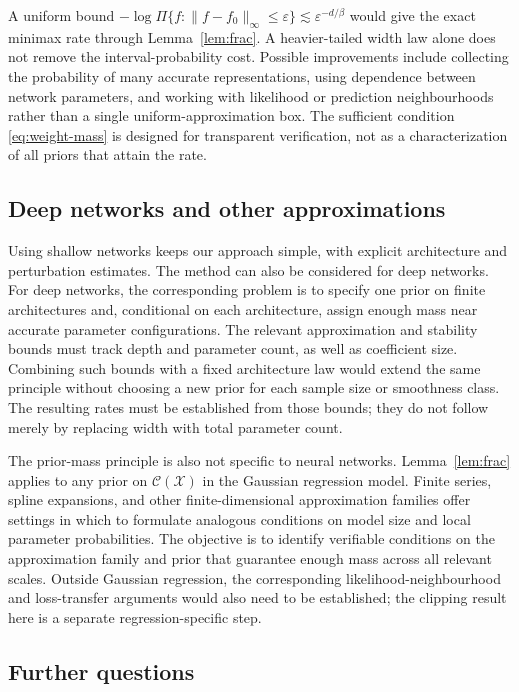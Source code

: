 \documentclass[11pt,a4paper]{article}
\theoremstyle{remark}
\newcommand{\Xcal}{\mathcal X}
\newcommand{\Ccal}{\mathcal C}
\newcommand{\norm}[1]{\lVert#1\rVert}
\begin{document}
A uniform bound
$-\log\Pi\{f:\norm{f-f_0}_\infty\leq\varepsilon\}
\lesssim\varepsilon^{-d/\beta}$ would give the exact minimax rate
through Lemma~\ref{lem:frac}. A heavier-tailed width law alone does
not remove the interval-probability cost. Possible improvements
include collecting the probability of many accurate representations,
using dependence between network parameters, and working with likelihood or
prediction neighbourhoods rather than a single uniform-approximation
box. The sufficient condition \eqref{eq:weight-mass} is designed for
transparent verification, not as a characterization of all priors
that attain the rate.

\subsection{Deep networks and other approximations}

Using shallow networks keeps our approach simple, with explicit
architecture and perturbation estimates. The method can also be
considered for deep networks. For deep
networks, the corresponding problem is to specify one prior on
finite architectures and, conditional on each architecture, assign
enough mass near accurate parameter configurations. The relevant
approximation and stability bounds must track depth and parameter
count, as well as coefficient size. Combining such bounds with a
fixed architecture law would extend the same principle without
choosing a new prior for each sample size or smoothness class.
The resulting rates must be established from those bounds; they do
not follow merely by replacing width with total parameter count.

The prior-mass principle is also not specific to neural networks.
Lemma~\ref{lem:frac} applies to any prior on $\Ccal(\Xcal)$ in the
Gaussian regression model. Finite series, spline expansions, and
other finite-dimensional approximation families offer settings in
which to formulate analogous conditions on model size and local
parameter probabilities. The objective is to identify verifiable
conditions on the approximation family and prior that guarantee
enough mass across all relevant scales. Outside Gaussian regression,
the corresponding likelihood-neighbourhood and loss-transfer
arguments would also need to be established; the clipping result
here is a separate regression-specific step.

\subsection{Further questions}
\end{document}
